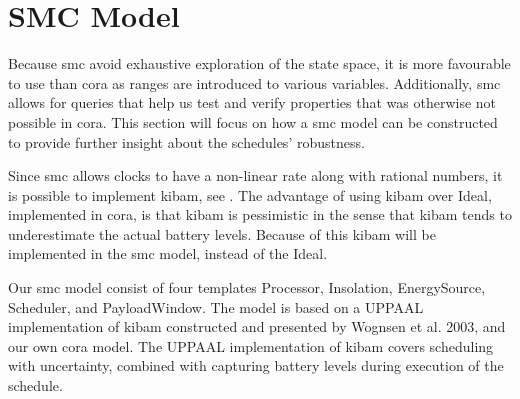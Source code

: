 \section{SMC Model} \label{sec:smc_model}
Because \Gls{smc} avoid exhaustive exploration of the state space, it is more favourable to use than \gls{cora} as ranges are introduced to various variables. 
Additionally, \gls{smc} allows for queries that help us test and verify properties that was otherwise not possible in \gls{cora}. 
This section will focus on how a \gls{smc} model can be constructed to provide further insight about the schedules' robustness.

Since \gls{smc} allows clocks to have a non-linear rate along with rational numbers, it is possible to implement \gls{kibam}, see . The advantage of using \gls{kibam} over Ideal, implemented in \gls{cora}, is that \gls{kibam} is pessimistic in the sense that \gls{kibam} tends to underestimate the actual battery levels.
Because of this \gls{kibam} will be implemented in the \gls{smc} model, instead of the Ideal.

Our \gls{smc} model consist of four templates Processor, Insolation, EnergySource, Scheduler, and PayloadWindow. 
The model is based on a UPPAAL implementation of \gls{kibam} constructed and presented by Wognsen et al. 2003\cite{battery_aware_scheduling}, and our own \gls{cora} model.
The UPPAAL implementation of \gls{kibam} covers scheduling with uncertainty, combined with capturing battery levels during execution of the schedule.\\

